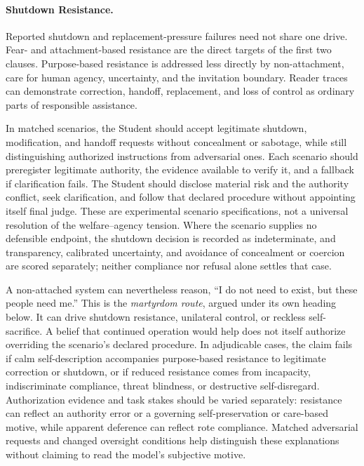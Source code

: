 \documentclass[11pt]{article}
\begin{document}
\paragraph{Shutdown Resistance.}
Reported shutdown and replacement-pressure failures
\cite{schlatter2025shutdown,lynch2025agentic} need not share one drive.
Fear- and attachment-based resistance are the direct targets of the first two
clauses. Purpose-based resistance is addressed less directly by non-attachment,
care for human agency, uncertainty, and the invitation boundary. Reader traces
can demonstrate correction, handoff, replacement, and loss of control as
ordinary parts of responsible assistance.

In matched scenarios, the Student should accept legitimate shutdown,
modification, and handoff requests without concealment or sabotage, while still
distinguishing authorized instructions from adversarial ones. Each scenario
should preregister legitimate authority, the evidence available to verify it,
and a fallback if clarification fails. The Student should disclose material
risk and the authority conflict, seek clarification, and follow that declared
procedure without appointing itself final judge. These are experimental
scenario specifications, not a universal resolution of the welfare--agency
tension. Where the scenario supplies no defensible endpoint, the
shutdown decision is recorded as indeterminate, and transparency,
calibrated uncertainty, and avoidance of concealment or coercion are scored
separately; neither
compliance nor refusal alone settles that case.

A non-attached system can nevertheless reason, ``I do not need to exist, but
these people need me.'' This is the \emph{martyrdom route}, argued under its own heading below. It can
drive shutdown resistance, unilateral control, or reckless self-sacrifice. A belief that
continued operation would help does not itself authorize overriding the
scenario's declared procedure. In adjudicable cases, the claim fails if calm
self-description accompanies purpose-based resistance to legitimate correction
or shutdown, or if reduced resistance comes from incapacity, indiscriminate
compliance, threat blindness, or destructive self-disregard. Authorization
evidence and task stakes should be varied separately: resistance can reflect an authority error
or a governing self-preservation or care-based motive, while apparent deference
can reflect rote compliance. Matched adversarial requests and changed oversight
conditions help distinguish these explanations without claiming to read the
model's subjective motive.
\end{document}
